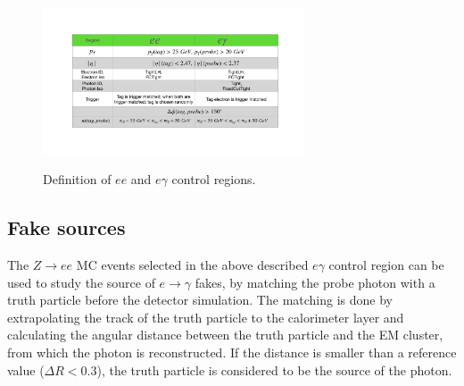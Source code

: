 \begin{figure}[!htbp]
\centering
{\includegraphics[width=0.69\textwidth]{figures/egammafakes/efakeCR.pdf}}
\caption [] {Definition of $ee$ and $e\gamma$ control regions.}
\label{fig:egammafake_cr}
\end{figure} 


\FloatBarrier
\subsection{Fake sources}
\label{sec:egammafakes_source}

The $Z\to ee$ MC events selected in the above described $e\gamma$ control region can be used to study the source of $e\to\gamma$ fakes, by matching the probe photon with a truth particle before the detector simulation.
The matching is done by extrapolating the track of the truth particle to the calorimeter layer and calculating the angular distance between the truth particle and the EM cluster, from which the photon is reconstructed.
If the distance is smaller than a reference value ($\Delta R < 0.3$), the truth particle is considered to be the source of the photon.

